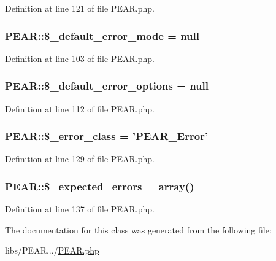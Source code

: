 Definition at line 121 of file P\-E\-A\-R.\-php.

\hypertarget{classPEAR_a6b3ff3d78a7b1d62c0de6b1190046a89}{
\subsubsection[{\$\-\_\-default\-\_\-error\-\_\-mode}]{\setlength{\rightskip}{0pt plus 5cm}P\-E\-A\-R\-::\$\-\_\-default\-\_\-error\-\_\-mode = null}}\label{classPEAR_a6b3ff3d78a7b1d62c0de6b1190046a89}


Definition at line 103 of file P\-E\-A\-R.\-php.

\hypertarget{classPEAR_ac71147b819daa267f29980e941efa23c}{
\subsubsection[{\$\-\_\-default\-\_\-error\-\_\-options}]{\setlength{\rightskip}{0pt plus 5cm}P\-E\-A\-R\-::\$\-\_\-default\-\_\-error\-\_\-options = null}}\label{classPEAR_ac71147b819daa267f29980e941efa23c}


Definition at line 112 of file P\-E\-A\-R.\-php.

\hypertarget{classPEAR_a6519b9822433b9dc3db0def7508e2b61}{
\subsubsection[{\$\-\_\-error\-\_\-class}]{\setlength{\rightskip}{0pt plus 5cm}P\-E\-A\-R\-::\$\-\_\-error\-\_\-class = '{\bf P\-E\-A\-R\-\_\-\-Error}'}}\label{classPEAR_a6519b9822433b9dc3db0def7508e2b61}


Definition at line 129 of file P\-E\-A\-R.\-php.

\hypertarget{classPEAR_ae20c719eaa8316ed0bd6cc83eaa6d0ac}{
\subsubsection[{\$\-\_\-expected\-\_\-errors}]{\setlength{\rightskip}{0pt plus 5cm}P\-E\-A\-R\-::\$\-\_\-expected\-\_\-errors = array()}}\label{classPEAR_ae20c719eaa8316ed0bd6cc83eaa6d0ac}


Definition at line 137 of file P\-E\-A\-R.\-php.



The documentation for this class was generated from the following file\-:\begin{DoxyCompactItemize}
\item 
libs/\-P\-E\-A\-R.../\hyperlink{PEAR_8php}{P\-E\-A\-R.\-php}\end{DoxyCompactItemize}
